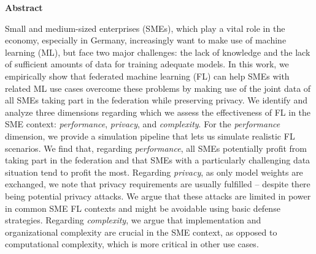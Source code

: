 {\Large \textbf{Abstract}}

\bigskip

Small and medium-sized enterprises (SMEs), which play a vital role in the economy, especially in Germany, increasingly want to make use of machine learning (ML), but face two major challenges: the lack of knowledge and the lack of sufficient amounts of data for training adequate models. In this work, we empirically show that federated machine learning (FL) can help SMEs with related ML use cases overcome these problems by making use of the joint data of all SMEs taking part in the federation while preserving privacy. We identify and analyze three dimensions regarding which we assess the effectiveness of FL in the SME context: \emph{performance}, \emph{privacy}, and \emph{complexity}. For the \emph{performance} dimension, we provide a simulation pipeline that lets us simulate realistic FL scenarios. We find that, regarding \emph{performance}, all SMEs potentially profit from taking part in the federation and that SMEs with a particularly challenging data situation tend to profit the most. Regarding \emph{privacy}, as only model weights are exchanged, we note that privacy requirements are usually fulfilled -- despite there being potential privacy attacks. We argue that these attacks are limited in power in common SME FL contexts and might be avoidable using basic defense strategies. Regarding \emph{complexity}, we argue that implementation and organizational complexity are crucial in the SME context, as opposed to computational complexity, which is more critical in other use cases.

